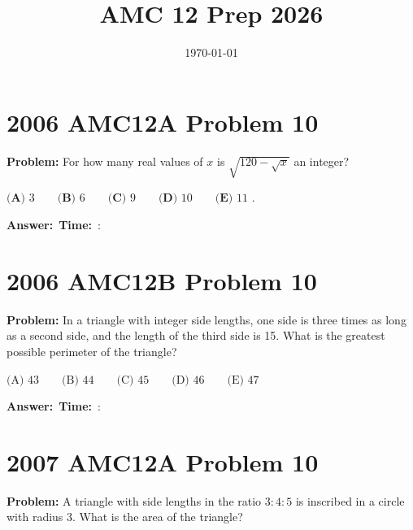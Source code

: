 \documentclass[12pt]{article}
\title{AMC 12 Prep 2026}
\author{}
\date{\today}
\begin{document}
\maketitle

\section{2006 AMC12A Problem 10}

\textbf{Problem:}
For how many real values of $x$ is $\sqrt{120-\sqrt{x}}$ an integer?

$\textbf{(A) } 3\qquad \textbf{(B) } 6\qquad \textbf{(C) } 9\qquad \textbf{(D) } 10\qquad \textbf{(E) } 11$ .

\vspace{0.3cm}
\noindent\textbf{Answer:}~\underline{\hspace{5cm}}\hfill\textbf{Time:}~\underline{\hspace{1.2cm}}:\underline{\hspace{1.2cm}}

\vspace{0.5cm}

\section{2006 AMC12B Problem 10}

\textbf{Problem:}
In a triangle with integer side lengths, one side is three times as long as a second side, and the length of the third side is 15. What is the greatest possible perimeter of the triangle?

$\text {(A) } 43 \qquad \text {(B) } 44 \qquad \text {(C) } 45 \qquad \text {(D) } 46 \qquad \text {(E) } 47$

\vspace{0.3cm}
\noindent\textbf{Answer:}~\underline{\hspace{5cm}}\hfill\textbf{Time:}~\underline{\hspace{1.2cm}}:\underline{\hspace{1.2cm}}

\vspace{0.5cm}

\section{2007 AMC12A Problem 10}

\textbf{Problem:}
A triangle with side lengths in the ratio $3 : 4 : 5$ is inscribed in a circle with radius 3. What is the area of the triangle?
\end{document}
